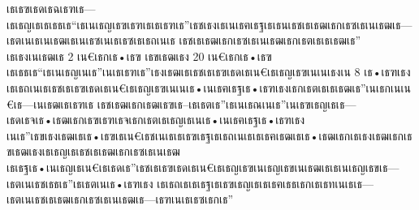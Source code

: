﻿%
\question เธเธฃเธดเธฉเธฑเธ—เธเธญเธเธเธธเธ“เธเนเธญเธฃเธฑเธเธเธฑเธ”เธชเธงเธเนเธฅเธฐเธเธนเธชเธเธฒเธกเธซเธเนเธฒเธ—เธตเนเธเนเธฒเธเนเธซเนเธเธซเธเธถเนเธ เธชเธเธฒเธกเธซเธเนเธฒเธกเธตเธเธเธฒเธ” เธเธงเนเธฒเธ 2 เน€เธกเธ•เธฃ เธขเธฒเธง 20 เน€เธกเธ•เธฃ เธเธธเธ“เธเนเธญเนเธ”เนเธเธฑเธ”เธงเธฒเธเธชเธเธฃเธดเธเน€เธเธญเธฃเนเนเธงเน 8 เธ•เธฑเธง เธเธถเนเธเธชเธเธฃเธดเธเน€เธเธญเธฃเนเนเธ•เนเธฅเธฐเธ•เธฑเธงเธกเธตเธเธเธฒเธ”เนเธกเนเน€เธ—เนเธฒเธเธฑเธ เธชเธฒเธกเธฒเธฃเธ–เธเธตเธ”เธเนเธณเนเธ”เนเธฃเธญเธเธ—เธดเธจเธ•เธฒเธกเธฃเธฑเธจเธกเธตเธเธญเธเนเธ•เนเธฅเธฐเธ•เธฑเธง เนเธ”เธขเธงเธฒเธเธ•เธฃเธเน€เธชเนเธเธเธฃเธฐเธเธถเนเธเธเธฅเธฒเธเธ•เธฒเธกเธเธงเธฒเธกเธขเธฒเธงเธเธญเธเธชเธเธฒเธกเธซเธเนเธฒ เธเธฐเธ•เนเธญเธเน€เธเธดเธ”เธชเธเธฃเธดเธเน€เธเธญเธฃเนเธญเธขเนเธฒเธเธเนเธญเธขเธ—เธตเนเธชเธธเธ”เธเธตเนเธ•เธฑเธง เธเธถเธเธเธฐเธเธฃเธญเธเธเธฅเธธเธกเธเธทเนเธเธ—เธตเนเธชเธเธฒเธกเธซเธเนเธฒเธ—เธฑเนเธเธซเธกเธ”
